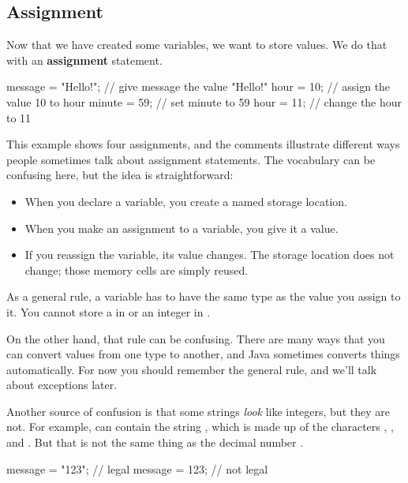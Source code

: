 \subsection{Assignment}


Now that we have created some variables, we want to store values.
We do that with an {\bf assignment} statement.

\begin{code}
    message = "Hello!";  // give message the value "Hello!"
    hour = 10;           // assign the value 10 to hour
    minute = 59;         // set minute to 59
    hour = 11;           // change the hour to 11
\end{code}

This example shows four assignments, and the comments illustrate different ways people sometimes talk about assignment statements.
The vocabulary can be confusing here, but the idea is straightforward:

\begin{itemize}
\item When you declare a variable, you create a named storage location.
\item When you make an assignment to a variable, you give it a value.
\item If you reassign the variable, its value changes.
The storage location does not change; those memory cells are simply reused.
\end{itemize}

As a general rule, a variable has to have the same type as the value you assign to it.
You cannot store a  in  or an integer in .

On the other hand, that rule can be confusing.
There are many ways that you can convert values from one type to another, and Java sometimes converts things automatically.
For now you should remember the general rule, and we'll talk about exceptions later.

Another source of confusion is that some strings {\em look} like integers, but they are not.
For example,  can contain the string , which is made up of the characters , , and .
But that is not the same thing as the decimal number .

\begin{code}
    message = "123";  // legal
    message = 123;    // not legal
\end{code}


